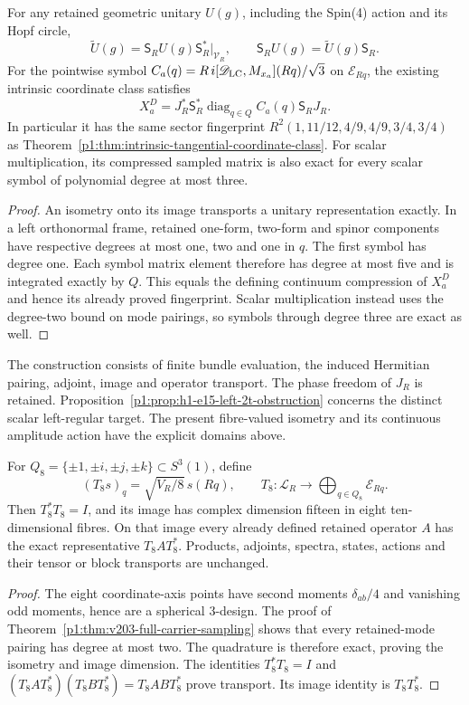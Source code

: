 \documentclass[11pt]{article}
\begin{document}
\begin{corollary}
\label{p1:cor:v203-full-symbol-transport}
For any retained geometric unitary $U(g)$, including the Spin(4) action and
its Hopf circle,
\[
 \widetilde U(g)=\mathsf S_RU(g)\mathsf S_R^*|_{\mathcal V_R},\qquad
 \mathsf S_RU(g)=\widetilde U(g)\mathsf S_R.
\]
For the pointwise symbol
$C_a(q)=R\,i[\mathscr D_{\rm LC},M_{x_a}](Rq)/\sqrt3$ on
$\mathcal E_{Rq}$, the existing intrinsic coordinate class satisfies
\[
 \boxed{X_a^D=J_R^*\mathsf S_R^*\operatorname{diag}_{q\in Q}C_a(q)
                  \mathsf S_RJ_R.}
\]
In particular it has the same sector fingerprint
$R^2(1,11/12,4/9,4/9,3/4,3/4)$ as
Theorem~\ref{p1:thm:intrinsic-tangential-coordinate-class}.
For scalar multiplication, its compressed sampled matrix is also exact
for every scalar symbol of polynomial degree at most three.
\end{corollary}
\begin{proof}
An isometry onto its image transports a unitary representation exactly.
In a left orthonormal frame, retained one-form, two-form and spinor
components have respective degrees at most one, two and one in $q$.
The first symbol has degree one. Each symbol matrix element therefore has
degree at most five and is integrated exactly by $Q$. This equals the
defining continuum compression of $X_a^D$ and hence its already proved
fingerprint. Scalar multiplication instead uses the degree-two bound on
mode pairings, so symbols through degree three are exact as well.
\end{proof}

The construction consists of finite bundle evaluation, the induced Hermitian
pairing, adjoint, image and operator transport. The phase freedom of $J_R$
is retained. Proposition~\ref{p1:prop:h1-e15-left-2t-obstruction} concerns
the distinct scalar left-regular target. The present fibre-valued isometry
and its continuous amplitude action have the explicit domains above.


\begin{corollary}
\label{p1:cor:v233-eight-fibre-sampling}
For \(Q_8=\{\pm1,\pm i,\pm j,\pm k\}\subset S^3(1)\), define
\[
 (T_8s)_q=\sqrt{V_R/8}\,s(Rq),\qquad
 T_8:\mathcal L_R\longrightarrow\bigoplus_{q\in Q_8}\mathcal E_{Rq}.
\]
Then \(T_8^*T_8=I\), and its image has complex dimension fifteen in
eight ten-dimensional fibres. On that image every already defined
retained operator \(A\) has the exact representative \(T_8AT_8^*\).
Products, adjoints, spectra, states, actions and their tensor or block
transports are unchanged.
\end{corollary}
\begin{proof}
The eight coordinate-axis points have second moments \(\delta_{ab}/4\)
and vanishing odd moments, hence are a spherical 3-design.
The proof of Theorem~\ref{p1:thm:v203-full-carrier-sampling} shows that
every retained-mode pairing has degree at most two. The quadrature is
therefore exact, proving the isometry and image dimension.
The identities \(T_8^*T_8=I\) and
\((T_8AT_8^*)(T_8BT_8^*)=T_8ABT_8^*\) prove transport.
Its image identity is \(T_8T_8^*\).
\end{proof}
\end{document}
